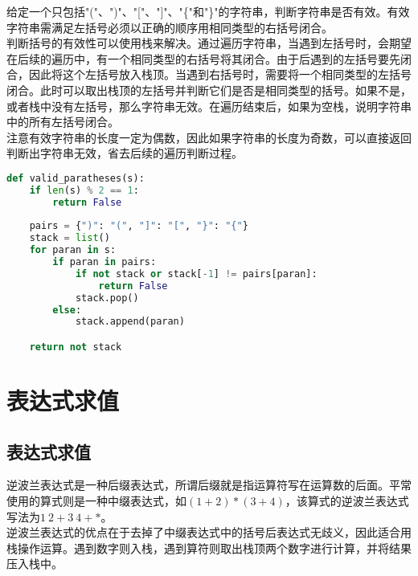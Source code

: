 给定一个只包括"("、")"、"["、"]"、"\{"和"\}"的字符串，判断字符串是否有效。有效字符串需满足左括号必须以正确的顺序用相同类型的右括号闭合。\\

判断括号的有效性可以使用栈来解决。通过遍历字符串，当遇到左括号时，会期望在后续的遍历中，有一个相同类型的右括号将其闭合。由于后遇到的左括号要先闭合，因此将这个左括号放入栈顶。当遇到右括号时，需要将一个相同类型的左括号闭合。此时可以取出栈顶的左括号并判断它们是否是相同类型的括号。如果不是，或者栈中没有左括号，那么字符串无效。在遍历结束后，如果为空栈，说明字符串中的所有左括号闭合。\\

注意有效字符串的长度一定为偶数，因此如果字符串的长度为奇数，可以直接返回判断出字符串无效，省去后续的遍历判断过程。\\


\begin{lstlisting}[language=Python]
def valid_paratheses(s):
    if len(s) % 2 == 1:
        return False
    
    pairs = {")": "(", "]": "[", "}": "{"}
    stack = list()
    for paran in s:
        if paran in pairs:
            if not stack or stack[-1] != pairs[paran]:
                return False
            stack.pop()
        else:
            stack.append(paran)

    return not stack
\end{lstlisting}

\newpage

\section{表达式求值}

\subsection{表达式求值}

逆波兰表达式是一种后缀表达式，所谓后缀就是指运算符写在运算数的后面。平常使用的算式则是一种中缀表达式，如$ (1 + 2) * (3 + 4) $，该算式的逆波兰表达式写法为$ 1\ 2 + 3\ 4 + * $。\\

逆波兰表达式的优点在于去掉了中缀表达式中的括号后表达式无歧义，因此适合用栈操作运算。遇到数字则入栈，遇到算符则取出栈顶两个数字进行计算，并将结果压入栈中。\\


